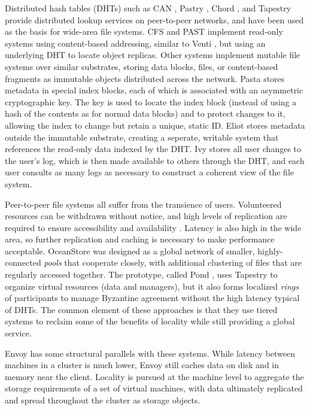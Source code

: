 Distributed hash tables (DHTs) such as CAN \cite{ratnasamy}, Pastry \cite{rowstron01b}, Chord \cite{stoica}, and Tapestry \cite{zhao01} provide distributed lookup services on peer-to-peer networks, and have been used as the basis for wide-area file systems. CFS \cite{dabek} and PAST \cite{rowstron01a} implement read-only systems using content-based addressing, similar to Venti \cite{quinlan}, but using an underlying DHT to locate object replicas. Other systems implement mutable file systems over similar substrates, storing data blocks, files, or content-based fragments \cite{rabin81} as immutable objects distributed across the network. Pasta \cite{moreton} stores metadata in special index blocks, each of which is associated with an asymmetric cryptographic key. The key is used to locate the index block (instead of using a hash of the contents as for normal data blocks) and to protect changes to it, allowing the index to change but retain a unique, static ID. Eliot \cite{stein02} stores metadata outside the immutable substrate, creating a seperate, writable system that references the read-only data indexed by the DHT. Ivy \cite{muthitacharoen02} stores all user changes to the user's log, which is then made available to others through the DHT, and each user consults as many logs as necessary to construct a coherent view of the file system.

Peer-to-peer file systems all suffer from the transience of users. Volunteered resources can be withdrawn without notice, and high levels of replication are required to ensure accessibility and availability \cite{blake,rabin89}. Latency is also high in the wide area, so further replication and caching is necessary to make performance acceptable. OceanStore \cite{kubiatowicz} was designed as a global network of smaller, highly-connected \emph{pools} that cooperate closely, with additional clustering of files that are regularly accessed together. The prototype, called Pond \cite{rhea}, uses Tapestry to organize virtual resources (data and managers), but it also forms localized \emph{rings} of participants to manage Byzantine agreement without the high latency typical of DHTs. The common element of these approaches is that they use tiered systems to reclaim some of the benefits of locality while still providing a global service.

Envoy has some structural parallels with these systems. While latency between machines in a cluster is much lower, Envoy still caches data on disk and in memory near the client. Locality is pursued at the machine level to aggregate the storage requirements of a set of virtual machines, with data ultimately replicated and spread throughout the cluster as storage objects.

